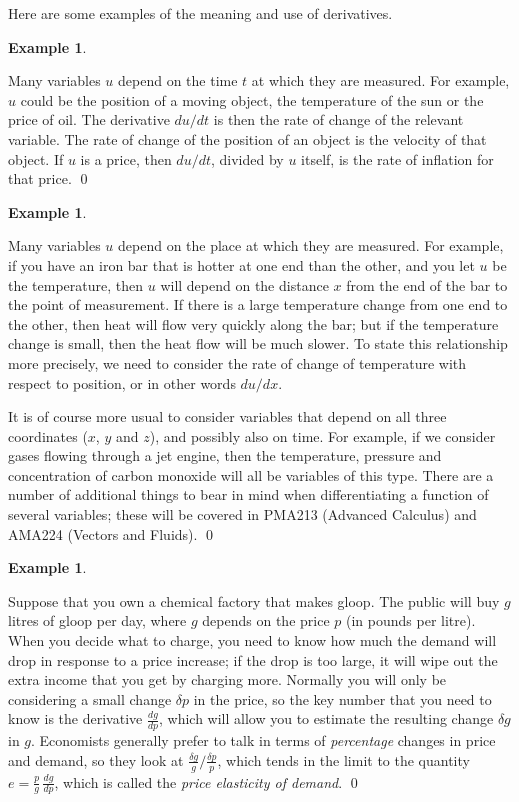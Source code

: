 \documentclass[a4paper]{book}
\newcommand{\RED}[1]{{\color{red}#1}}
\newcommand{\PURPLE}[1]{{\color{purple}#1}}
\newcommand{\dl}        {\delta}
\renewcommand{\:}{\colon}
\newcommand{\PMA}[1]{PMA#1}
\newcommand{\bilabel}[1]{\hypertarget{#1}{\label{#1}}}
\newcommand{\EMPH}[1]{\RED{\emph{#1}}}
\newcommand{\DEFN}[1]{\PURPLE{\emph{#1}}}
\theoremstyle{definition}
\newtheorem{example}[theorem]{Example}
\begin{document}
Here are some examples of the meaning and use of derivatives.
\begin{example}\bilabel{eg-time-deriv}
 Many variables $u$ depend on the time $t$ at which they are measured.
 For example, $u$ could be the position of a moving object, the
 temperature of the sun or the price of oil.  The derivative $du/dt$
 is then the rate of change of the relevant variable.  The rate of
 change of the position of an object is the velocity of that object.
 If $u$ is a price, then $du/dt$, divided by $u$ itself, is the rate
 of inflation for that price. \qed
\end{example}
\begin{example}\bilabel{eg-space-deriv}
 Many variables $u$ depend on the place at which they are measured.
 For example, if you have an iron bar that is hotter at one end than
 the other, and you let $u$ be the temperature, then $u$ will depend
 on the distance $x$ from the end of the bar to the point of
 measurement.  If there is a large temperature change from one end to
 the other, then heat will flow very quickly along the bar; but if the
 temperature change is small, then the heat flow will be much slower.
 To state this relationship more precisely, we need to consider the
 rate of change of temperature with respect to position, or in other
 words $du/dx$.  

 It is of course more usual to consider variables that depend on all
 three coordinates ($x$, $y$ and $z$), and possibly also on time.  For
 example, if we consider gases flowing through a jet engine, then the
 temperature, pressure and concentration of carbon monoxide will all
 be variables of this type.  There are a number of additional things
 to bear in mind when differentiating a function of several variables;
 these will be covered in \PMA{213} (Advanced Calculus) and AMA224
 (Vectors and Fluids). \qed
\end{example}
\begin{example}\bilabel{eg-gloop}
 Suppose that you own a chemical factory that makes gloop.  The public
 will buy $g$ litres of gloop per day, where $g$ depends on the price
 $p$ (in pounds per litre).  When you decide what to charge, you need
 to know how much the demand will drop in response to a price
 increase; if the drop is too large, it will wipe out the extra income
 that you get by charging more.  Normally you will only be considering
 a small change $\dl p$ in the price, so the key number that you need
 to know is the derivative $\frac{dg}{dp}$, which will allow you to
 estimate the resulting change $\dl g$ in $g$.  Economists generally
 prefer to talk in terms of \EMPH{percentage} changes in price and
 demand, so they look at $\frac{\dl g}{g}/\frac{\dl p}{p}$, which
 tends in the limit to the quantity $e=\frac{p}{g}\,\frac{dg}{dp}$,
 which is called the \DEFN{price elasticity of demand}.
 \qed
\end{example}
\end{document}
